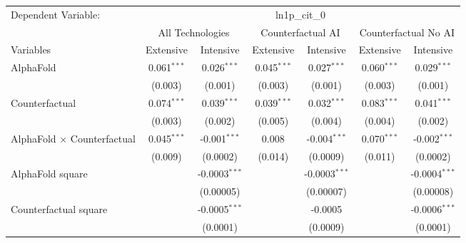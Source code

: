 \begingroup
\centering
\begin{tabular}{lcccccc}
   \tabularnewline \midrule \midrule
   Dependent Variable: & \multicolumn{6}{c}{ln1p\_cit\_0}\\
 & \multicolumn{2}{c}{All Technologies} & \multicolumn{2}{c}{Counterfactual AI} & \multicolumn{2}{c}{Counterfactual No AI} \\
\cmidrule(lr){1-1}\cmidrule(lr){2-3} \cmidrule(lr){4-5} \cmidrule(lr){6-7}
Variables & \multicolumn{1}{c}{Extensive} & \multicolumn{1}{c}{Intensive} & \multicolumn{1}{c}{Extensive} & \multicolumn{1}{c}{Intensive} & \multicolumn{1}{c}{Extensive} & \multicolumn{1}{c}{Intensive} \\
\cmidrule(lr){1-1}\cmidrule(lr){2-2} \cmidrule(lr){3-3} \cmidrule(lr){4-4} \cmidrule(lr){5-5} \cmidrule(lr){6-6} \cmidrule(lr){7-7}
   AlphaFold                          & 0.061$^{***}$ & 0.026$^{***}$     & 0.045$^{***}$ & 0.027$^{***}$    & 0.060$^{***}$ & 0.029$^{***}$\\   
                                      & (0.003)       & (0.001)           & (0.003)       & (0.001)          & (0.003)       & (0.001)\\   
   Counterfactual                     & 0.074$^{***}$ & 0.039$^{***}$     & 0.039$^{***}$ & 0.032$^{***}$    & 0.083$^{***}$ & 0.041$^{***}$\\   
                                      & (0.003)       & (0.002)           & (0.005)       & (0.004)          & (0.004)       & (0.002)\\   
   AlphaFold $\times$ Counterfactual  & 0.045$^{***}$ & -0.001$^{***}$    & 0.008         & -0.004$^{***}$   & 0.070$^{***}$ & -0.002$^{***}$\\   
                                      & (0.009)       & (0.0002)          & (0.014)       & (0.0009)         & (0.011)       & (0.0002)\\   
   AlphaFold square                   &               & -0.0003$^{***}$   &               & -0.0003$^{***}$  &               & -0.0004$^{***}$\\   
                                      &               & (0.00005)         &               & (0.00007)        &               & (0.00008)\\   
   Counterfactual square              &               & -0.0005$^{***}$   &               & -0.0005          &               & -0.0006$^{***}$\\   
                                      &               & (0.0001)          &               & (0.0009)         &               & (0.0001)\\   

\end{tabular}
